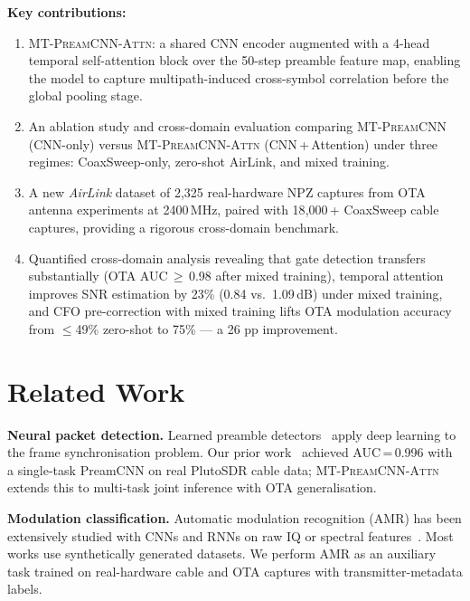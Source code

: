 \documentclass[conference]{IEEEtran}
\newcommand{\mtcnn}{\textsc{MT-PreamCNN}}
\newcommand{\mtcnnattn}{\textsc{MT-PreamCNN-Attn}}
\begin{document}
\textbf{Key contributions:}
\begin{enumerate}
  \item \mtcnnattn{}: a shared CNN encoder augmented with a
    4-head temporal self-attention block over the 50-step preamble
    feature map, enabling the model to capture multipath-induced
    cross-symbol correlation before the global pooling stage.

  \item An ablation study and cross-domain evaluation comparing
    \mtcnn{} (CNN-only) versus \mtcnnattn{} (CNN\,+\,Attention)
    under three regimes: CoaxSweep-only, zero-shot AirLink, and
    mixed training.

  \item A new \emph{AirLink} dataset of 2{,}325 real-hardware
    NPZ captures from OTA antenna experiments at 2400\,MHz,
    paired with 18{,}000\,+ CoaxSweep cable captures, providing
    a rigorous cross-domain benchmark.

  \item Quantified cross-domain analysis revealing that gate detection
    transfers substantially (OTA AUC\,$\ge$\,0.98 after mixed training),
    temporal attention improves SNR estimation by 23\% (0.84 vs.\ 1.09\,dB)
    under mixed training,
    and CFO pre-correction with mixed training lifts OTA modulation
    accuracy from $\le$49\% zero-shot to 75\% — a 26 pp improvement.
\end{enumerate}

\section{Related Work}
\label{sec:related}

\textbf{Neural packet detection.}
Learned preamble detectors~\cite{peng2019deep,o2017introduction} apply
deep learning to the frame synchronisation problem.
Our prior work~\cite{liu2026aisensing} achieved AUC\,=\,0.996 with a
single-task PreamCNN on real PlutoSDR cable data; \mtcnnattn{} extends
this to multi-task joint inference with OTA generalisation.

\textbf{Modulation classification.}
Automatic modulation recognition (AMR) has been extensively studied
with CNNs and RNNs on raw IQ or spectral
features~\cite{oshea2016convolutional,west2017deep}.
Most works use synthetically generated datasets.
We perform AMR as an auxiliary task trained on real-hardware cable
and OTA captures with transmitter-metadata labels.
\end{document}
